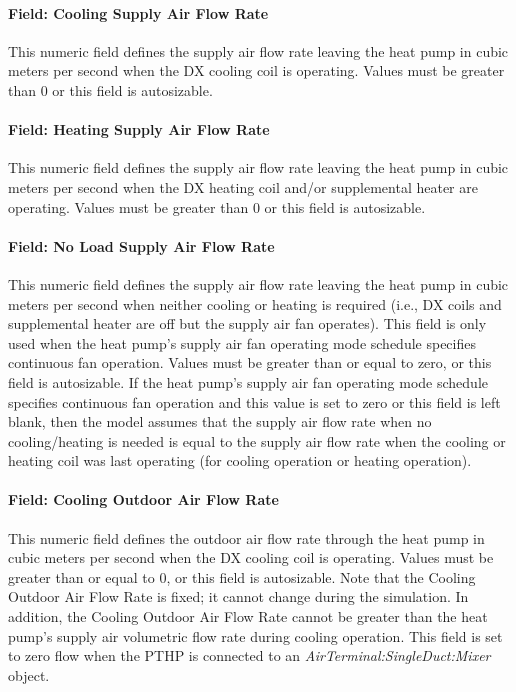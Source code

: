 \paragraph{Field: Cooling Supply Air Flow Rate}\label{field-cooling-supply-air-flow-rate-1-001}

This numeric field defines the supply air flow rate leaving the heat pump in cubic meters per second when the DX cooling coil is operating. Values must be greater than 0 or this field is autosizable.

\paragraph{Field: Heating Supply Air Flow Rate}\label{field-heating-supply-air-flow-rate-1-001}

This numeric field defines the supply air flow rate leaving the heat pump in cubic meters per second when the DX heating coil and/or supplemental heater are operating. Values must be greater than 0 or this field is autosizable.

\paragraph{Field: No Load Supply Air Flow Rate}\label{field-no-load-supply-air-flow-rate-1-001}

This numeric field defines the supply air flow rate leaving the heat pump in cubic meters per second when neither cooling or heating is required (i.e., DX coils and supplemental heater are off but the supply air fan operates). This field is only used when the heat pump's supply air fan operating mode schedule specifies continuous fan operation. Values must be greater than or equal to zero, or this field is autosizable. If the heat pump's supply air fan operating mode schedule specifies continuous fan operation and this value is set to zero or this field is left blank, then the model assumes that the supply air flow rate when no cooling/heating is needed is equal to the supply air flow rate when the cooling or heating coil was last operating (for cooling operation or heating operation).

\paragraph{Field: Cooling Outdoor Air Flow Rate}\label{field-cooling-outdoor-air-flow-rate-1}

This numeric field defines the outdoor air flow rate through the heat pump in cubic meters per second when the DX cooling coil is operating. Values must be greater than or equal to 0, or this field is autosizable. Note that the Cooling Outdoor Air Flow Rate is fixed; it cannot change during the simulation. In addition, the Cooling Outdoor Air Flow Rate cannot be greater than the heat pump's supply air volumetric flow rate during cooling operation.
This field is set to zero flow when the PTHP is connected to an \textit{AirTerminal:SingleDuct:Mixer} object.

